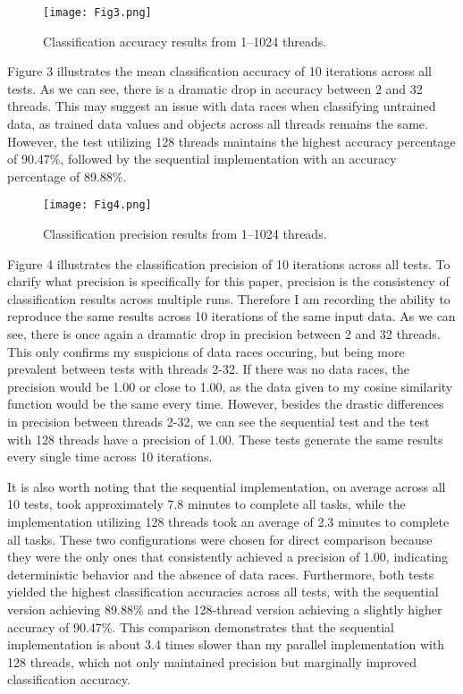 \documentclass[conference]{IEEEtran}
\begin{document}
\begin{figure}[htbp]
\centerline{\texttt{[image: Fig3.png]}}
\caption{Classification accuracy results from 1--1024 threads.}
\label{fig}
\end{figure}

Figure 3 illustrates the mean classification accuracy of 10 iterations across all tests. As we can see, there is a dramatic drop in accuracy between 2 and 32 threads. This may suggest an issue with data races when classifying untrained data, as trained data values and objects across all threads remains the same. However, the test utilizing 128 threads maintains the highest accuracy percentage of 90.47\%, followed by the sequential implementation with an accuracy percentage of 89.88\%. 

\begin{figure}[htbp]
\centerline{\texttt{[image: Fig4.png]}}
\caption{Classification precision results from 1--1024 threads.}
\label{fig}
\end{figure}

Figure 4 illustrates the classification precision of 10 iterations across all tests. To clarify what precision is specifically for this paper, precision is the consistency of classification results across multiple runs. Therefore I am recording the ability to reproduce the same results across 10 iterations of the same input data. As we can see, there is once again a dramatic drop in precision between 2 and 32 threads. This only confirms my suspicions of data races occuring, but being more prevalent between tests with threads 2-32. If there was no data races, the precision would be 1.00 or close to 1.00, as the data given to my cosine similarity function would be the same every time. However, besides the drastic differences in precision between threads 2-32, we can see the sequential test and the test with 128 threads have a precision of 1.00. These tests generate the same results every single time across 10 iterations.

It is also worth noting that the sequential implementation, on average across all 10 tests, took approximately 7.8 minutes to complete all tasks, while the implementation utilizing 128 threads took an average of 2.3 minutes to complete all tasks. These two configurations were chosen for direct comparison because they were the only ones that consistently achieved a precision of 1.00, indicating deterministic behavior and the absence of data races. Furthermore, both tests yielded the highest classification accuracies across all tests, with the sequential version achieving 89.88\% and the 128-thread version achieving a slightly higher accuracy of 90.47\%. This comparison demonstrates that the sequential implementation is about 3.4 times slower than my parallel implementation with 128 threads, which not only maintained precision but marginally improved classification accuracy.
\end{document}
